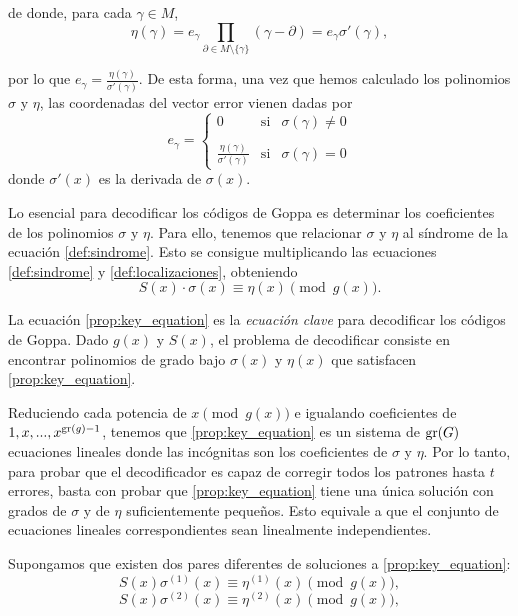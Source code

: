 de donde, para cada $\gamma \in M$,
\[
    \eta (\gamma) = e_\gamma \prod_{\partial \in M \setminus \{ \gamma \} } (\gamma - \partial) = e_\gamma \sigma'(\gamma),
\]

por lo que $e_\gamma = \frac{\eta(\gamma)}{\sigma'(\gamma)}$. De esta forma, una vez que hemos calculado los polinomios $\sigma$ y $\eta$, las coordenadas del vector error vienen dadas por 
\[
    e_\gamma = \left\{ \begin{array}{lcc}
    0 &   \text{si}  & \sigma(\gamma) \neq 0 \\
    \\ \frac{\eta(\gamma)}{\sigma'(\gamma)} &  \text{si} & \sigma(\gamma) = 0
    \end{array}
    \right.
\]
donde $\sigma'(x)$ es la derivada de $\sigma(x)$.

Lo esencial para decodificar los códigos de Goppa es determinar los coeficientes de los polinomios $\sigma$ y $\eta$. Para ello, tenemos que relacionar $\sigma$ y $\eta$ al síndrome de la ecuación \eqref{def:sindrome}. Esto se consigue multiplicando las ecuaciones \eqref{def:sindrome} y \eqref{def:localizaciones}, obteniendo
\begin{equation}
    \label{prop:key_equation}
    S(x) \cdot \sigma(x) \equiv \eta(x) \pmod{g(x)}.
\end{equation}

La ecuación \eqref{prop:key_equation} es la \emph{ecuación clave} para decodificar los códigos de Goppa. Dado $g(x)$ y $S(x)$, el problema de decodificar consiste en encontrar polinomios de grado bajo $\sigma(x)$ y $\eta(x)$ que satisfacen \eqref{prop:key_equation}.

Reduciendo cada potencia de $x \pmod{g(x)}$ e igualando coeficientes de $1, x, ..., x^{\operatorname{gr}(g) - 1}$, tenemos que \eqref{prop:key_equation} es un sistema de $\operatorname{gr}(G)$ ecuaciones lineales donde las incógnitas son los coeficientes de $\sigma$ y $\eta$. Por lo tanto, para probar que el decodificador es capaz de corregir todos los patrones hasta $t$ errores, basta con probar que \eqref{prop:key_equation} tiene una única solución con grados de $\sigma$ y de $\eta$ suficientemente pequeños. Esto equivale a que el conjunto de ecuaciones lineales correspondientes sean linealmente independientes.

Supongamos que existen dos pares diferentes de soluciones a \eqref{prop:key_equation}:
\begin{equation}
    \label{prop:key_equation_1}
    S(x) \sigma^{(1)}(x) \equiv \eta^{(1)}(x) \pmod{g(x)},
\end{equation}
\begin{equation}
    \label{prop:key_equation_2}
    S(x) \sigma^{(2)}(x) \equiv \eta^{(2)}(x) \pmod{g(x)},
\end{equation}

